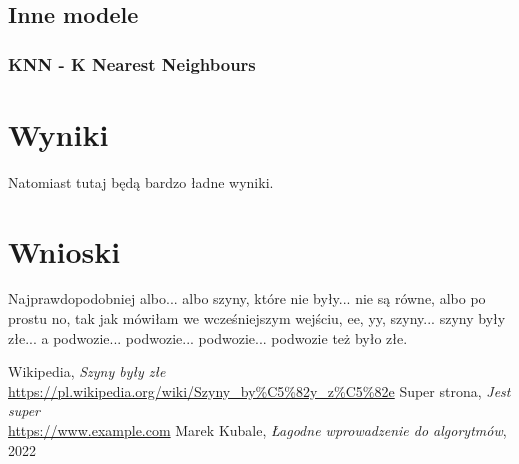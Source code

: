 \documentclass{article}
\begin{document}
\subsection{Inne modele}
\subsubsection{KNN - K Nearest Neighbours}

\section{Wyniki}

Natomiast tutaj będą bardzo ładne wyniki.

\section{Wnioski}

Najprawdopodobniej albo... albo szyny, 
które nie były... nie są równe, 
albo po prostu no, tak jak mówiłam we 
wcześniejszym wejściu, ee, yy, szyny... 
szyny były złe... a podwozie... podwozie... 
podwozie... podwozie też było złe. \cite{szyny}

\renewcommand{\refname}{Źródła}
\begin{thebibliography}{100}
     Wikipedia, 
    \textit{Szyny były złe} 
    \\\url{https://pl.wikipedia.org/wiki/Szyny_by%C5%82y_z%C5%82e}
     Super strona,
    \textit{Jest super}
    \\\url{https://www.example.com}
     Marek Kubale,
    \textit{Łagodne wprowadzenie do algorytmów}, 2022
\end{thebibliography}
\end{document}
